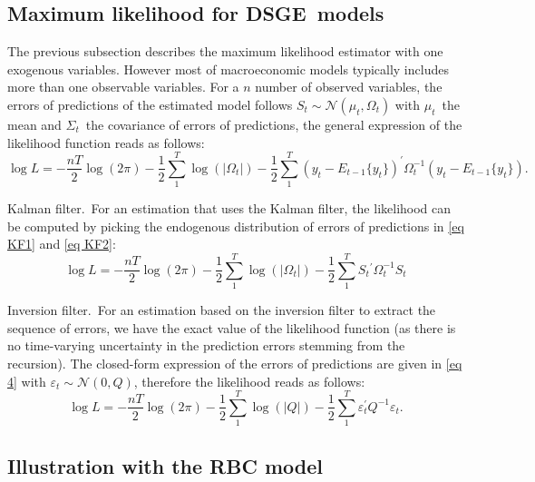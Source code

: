\documentclass[a4paper,12pt]{article}%
\begin{document}
\subsection{Maximum likelihood for DSGE\ models}

The previous subsection describes the maximum likelihood estimator with one
exogenous variables. However most of macroeconomic models typically includes
more than one observable variables. For a $n$ number of observed variables,
the errors of predictions of the estimated model follows $S_{t}\sim
\mathcal{N}(\mu_{t},\Omega_{t})$ with $\mu_{t}$\ the mean and $\Sigma_{t}%
$\ the covariance of errors of predictions, the general expression of the
likelihood function reads as follows:%
\begin{equation}
\log L=-\frac{nT}{2}\log(2\pi)-\frac{1}{2}\sum_{1}^{T}\log\left(  |\Omega
_{t}|\right)  -\frac{1}{2}\sum_{1}^{T}\left(  y_{t}-E_{t-1}\{y_{t}\}\right)
^{\prime}\Omega_{t}^{-1}\left(  y_{t}-E_{t-1}\{y_{t}\}\right)  .
\end{equation}


\textsf{Kalman filter.}\ For an estimation that uses the Kalman filter, the
likelihood can be computed by picking the endogenous distribution of errors of
predictions in \autoref{eq KF1} and \autoref{eq KF2}:%
\begin{equation}
\log L=-\frac{nT}{2}\log(2\pi)-\frac{1}{2}\sum_{1}^{T}\log\left(  |\Omega
_{t}|\right)  -\frac{1}{2}\sum_{1}^{T}S_{t}{}^{\prime}\Omega_{t}^{-1}S_{t}
\label{eq LLK DSGE KF}%
\end{equation}


\textsf{Inversion filter.}\ For an estimation based on the inversion filter to
extract the sequence of errors, we have the exact value of the likelihood
function (as there is no time-varying uncertainty in the prediction errors
stemming from the recursion). The closed-form expression of the errors of
predictions are given in \autoref{eq 4} with $\varepsilon_{t}\sim
\mathcal{N}(0,Q)$, therefore the likelihood reads as follows:%
\begin{equation}
\log L=-\frac{nT}{2}\log(2\pi)-\frac{1}{2}\sum_{1}^{T}\log\left(  |Q|\right)
-\frac{1}{2}\sum_{1}^{T}\varepsilon_{t}^{\prime}Q^{-1}\varepsilon_{t}.
\label{eq LLK DSGE IF}%
\end{equation}


\subsection{Illustration with the RBC model}
\end{document}
